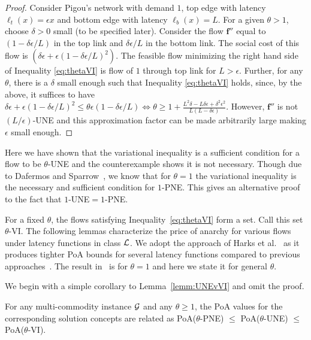 \begin{proof}
Consider Pigou's network with demand $1$, top edge with latency $\ell_t(x) = \epsilon x$ and bottom edge with latency $\ell_b(x) = L$. For a given $\theta>1$, choose $\delta>0$ small (to be specified later).
 Consider the flow $\bm{f}''$ equal to
 $(1-\delta\epsilon/L)$ in the top link and $\delta\epsilon/L$ in the bottom link. 
 The social cost of this flow is $\left(\delta\epsilon+\epsilon(1-\delta\epsilon/L)^2\right)$. The feasible flow minimizing the right hand side of Inequality \eqref{eq:thetaVI} is flow of $1$ through top link for $L>\epsilon$. Further, for any $\theta$, there is a $\delta$ small enough such that Inequality  \eqref{eq:thetaVI} holds, since, by the above, it suffices to have $\delta\epsilon+ \epsilon(1-\delta\epsilon/L)^2 \leq\theta \epsilon(1-\delta\epsilon/L)
\Leftrightarrow \theta\geq 1+ \frac{L^2\delta-L\delta \epsilon+\delta^2 \epsilon^2}{L(L-\delta\epsilon)} $. 
However, $\bm{f}''$ is not $(L/\epsilon)$-UNE and this approximation factor can be made arbitrarily large making $\epsilon$ small enough. 
\end{proof}

\begin{remark}
Here we have shown that the variational inequality is a sufficient condition for a flow to be $\theta$-UNE and the counterexample shows it is not necessary. Though due to Dafermos and Sparrow~\cite{dafermos1969traffic}, we know that for $\theta=1$ the variational inequality is the necessary and sufficient condition for $1$-PNE. This gives an alternative proof to the fact that $1$-UNE$=1$-PNE.
\end{remark}


For a fixed $\theta$, the flows satisfying Inequality~\eqref{eq:thetaVI} form a set. Call this set $\theta$-VI. %
The following lemmas characterize the price of anarchy for various flows under latency functions in class $\mathcal{L}$. We adopt the approach of Harks et al.~\cite{harks2007price} as it produces tighter PoA bounds for several latency functions compared to previous approaches~\cite{roughgarden2002selfish, correa2008geometric}. The result in~\cite{harks2007price} is for $\theta=1$ and here we state it for general $\theta$. 

We begin with a simple corollary to Lemma~\ref{lemm:UNEvVI} and omit the proof.
\begin{corollary}
For any multi-commodity instance $\mathcal{G}$ and any $\theta\geq 1$, the PoA values for the corresponding solution concepts are related as PoA($\theta$-PNE) $\leq $  PoA($\theta$-UNE) $\leq $  PoA($\theta$-VI).
\end{corollary}
  
